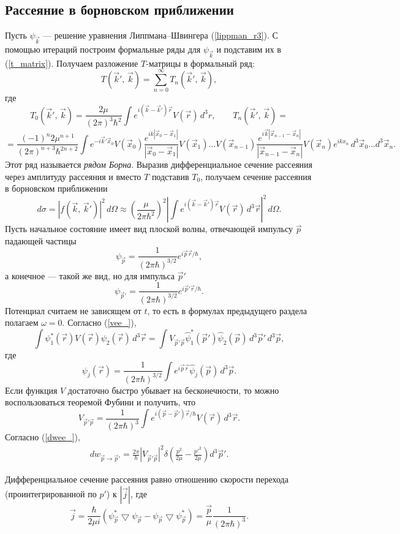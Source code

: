 \documentclass[a4paper
]{article}
\begin{document}
\subsection{Рассеяние в борновском приближении}
Пусть $\psi_{\vec k}$ --- решение уравнения Липпмана--Швингера
(\ref{lippman_r3}). С помощью итераций построим формальные ряды для
$\psi_{\vec k}$ и подставим их в (\ref{t_matrix}). Получаем
разложение $T$-матрицы в формальный ряд:
$$T(\vec k', \, \vec k)=\sum \limits_{n=0}^\infty T_n(\vec k', \, \vec k),$$
где $$T_0(\vec k', \, \vec k)=\frac{2\mu}{(2\pi)^3\hbar^2}\int
e^{i(\vec k- \vec k')\vec r}V(\vec r)\, d^3r,\qquad T_n(\vec k', \,
\vec k)= $$ $$=\frac{(-1)^n2\mu^{n+1}}{(2\pi)^{n+3}
\hbar^{2n+2}}\int e^{-i\vec k'\vec x_0}V(\vec x_0)\frac{e^{ik|\vec
x_0-\vec x_1|}}{|\vec x_0- \vec x_1|}V(\vec x_1)\dots V(\vec
x_{n-1})\frac{e^{i\vec k|\vec x_{n-1}-\vec x_n|}}{|\vec
x_{n-1}-\vec x_n|}V(\vec x_n)e^{ikx_n}\, d^3\vec x_0\dots d^3\vec x_n.$$
Этот ряд называется {\it рядом Борна}. Выразив дифференциальное
сечение рассеяния через амплитуду рассеяния и вместо $T$ подставив
$T_0$, получаем сечение рассеяния в борновском приближении
$$d\sigma=|f(\vec k, \, \vec k')|^2\, d\Omega\approx\left(\frac{\mu}{2\pi
\hbar^2}\right)^2\left|\int e^{i(\vec k-\vec k')\vec r}V(\vec r)\,
d^3\vec r\right|^2\, d\Omega.$$
Пусть начальное состояние имеет вид плоской волны, отвечающей импульсу
$\vec p$ падающей частицы $$\psi _{\vec p}=\frac{1}{(2\pi \hbar)^{3/2}}
e^{i\vec p\vec r/\hbar},$$ а конечное --- такой же вид, но для импульса
$\vec p'$ $$\psi_{\vec p'}=\frac{1}{(2\pi \hbar)^{3/2}}e^{i\vec p'\vec r/
\hbar}.$$ Потенциал считаем не зависящем от $t$, то есть в формулах
предыдущего раздела полагаем $\omega=0$. Согласно (\ref{vee_}),
$$\int \psi^*_1(\vec r)V(\vec r)\psi_2(\vec r)\, d^3\vec r=
\int V_{\vec p'\vec p}\hat \psi^*_1(\vec p')\hat \psi_2(\vec p)\, d^3
\vec p'\, d^3\vec p,$$ где $$\psi_j(\vec r)=\frac{1}{(2\pi\hbar)^{3/2}}
\int e^{i\vec p\vec r}\hat \psi_j(\vec p)\, d^3\vec p.$$ Если функция
$V$ достаточно быстро убывает на бесконечности, то можно воспользоваться
теоремой Фубини и получить, что $$V_{\vec p'\vec p}=\frac{1}{(2\pi
\hbar)^3}\int e^{i(\vec p-\vec p')\vec r/\hbar}V(\vec r)\, d^3\vec r.$$
Согласно (\ref{dwee_}),
\begin{align}
\label{9wpp}
dw_{\vec p\rightarrow \vec p'}=\frac{2\pi}{\hbar}|V_{\vec p'\vec p}|^2
\delta\left(\frac{p^2}{2\mu}-\frac{p'^2}{2\mu}\right)d^3\vec p'.
\end{align}
\begin{Sta}
Дифференциальное сечение рассеяния равно отношению скорости
перехода \\ (проинтегрированной по $p'$) к $|\vec j|$, где $$\vec j=\frac{\hbar}
{2\mu i}(\psi^*_{\vec p}\bigtriangledown \psi_{\vec p}-\psi_{\vec p}
\bigtriangledown \psi^*_{\vec p})=\frac{\vec p}{\mu}\frac{1}{(2\pi
\hbar)^3}.$$
\end{Sta}
\end{document}
